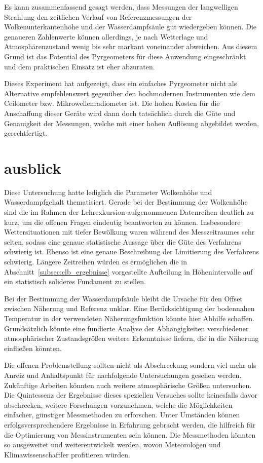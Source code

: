 \documentclass[10pt,a4paper,compsoc,peer review papers]{IEEEtran}
\begin{document}
Es kann zusammenfassend gesagt werden, dass Messungen der langwelligen Strahlung 
den zeitlichen Verlauf von Referenzmessungen der Wolkenunterkantenhöhe und der 
Wasserdampfsäule gut wiedergeben können. Die genaueren Zahlenwerte können 
allerdings, je nach Wetterlage und Atmosphärenzustand wenig bis sehr markant 
voneinander abweichen. Aus diesem Grund ist das Potential des Pyrgeometers für 
diese Anwendung eingeschränkt und dem praktischen Einsatz ist eher abzuraten. 

Dieses Experiment hat aufgezeigt, dass ein einfaches Pyrgeometer nicht als 
Alternative empfehlenswert gegenüber den hochmodernen Instrumenten wie dem 
Ceilometer bzw. Mikrowellenradiometer ist. Die hohen Kosten für die Anschaffung 
dieser Geräte wird dann doch tatsächlich durch die Güte und Genauigkeit der 
Messungen, welche mit einer hohen Auflösung abgebildet werden, gerechtfertigt. 

\section{ausblick}\label{sec:ausblick}
Diese Untersuchung hatte lediglich die Parameter Wolkenhöhe und 
Wasserdampfgehalt thematisiert. Gerade bei der Bestimmung der Wolkenhöhe sind
die im Rahmen der Lehrexkursion aufgenommenen Datenreihen deutlich zu kurz, um
die offenen Fragen eindeutig beantworten zu können. Insbesondere 
Wettersituationen mit tiefer Bewölkung waren während des Messzeitraumes sehr selten, sodass eine
genaue statistische Aussage über die Güte des Verfahrens schwierig ist. Ebenso
ist eine genaue Beschreibung der Limitierung des Verfahrens schwierig. Längere
Zeitreihen würden es ermöglichen die in Abschnitt~\ref{subsec:clb_ergebnisse}
vorgestellte Aufteilung in Höhenintervalle auf ein statistisch solideres 
Fundament
zu stellen.

Bei der Bestimmung der Wasserdampfsäule bleibt die Ursache für den Offset 
zwischen Näherung und Referenz unklar. Eine Berücksichtigung der bodennahen Temperatur
in der verwendeten Näherungsfunktion könnte hier Abhilfe schaffen. Grundsätzlich
könnte eine fundierte Analyse der Abhängigkeiten verschiedener atmosphärischer 
Zustandsgrößen weitere Erkenntnisse liefern, die in die Näherung einfließen 
könnten. 

Die offenen Problemstellung sollten nicht als Abschreckung sondern viel mehr als
Anreiz und Anhaltspunkt für nachfolgende Untersuchungen gesehen werden.
Zukünftige Arbeiten könnten auch weitere atmosphärische Größen untersuchen.
Die Quintessenz der Ergebnisse dieses speziellen Versuches sollte
keinesfalls davor abschrecken, weitere Forschungen vorzunehmen, 
welche die Möglichkeiten einfacher, günstiger Messmethoden zu erforschen. Unter 
Umständen können erfolgsversprechendere Ergebnisse in Erfahrung gebracht werden, 
die hilfreich für die Optimierung von Messinstrumenten sein können. Die 
Messmethoden könnten so ausgeweitet und weiterentwickelt werden, wovon 
Meteorologen und Klimawissenschaftler profitieren würden.




\end{document}
